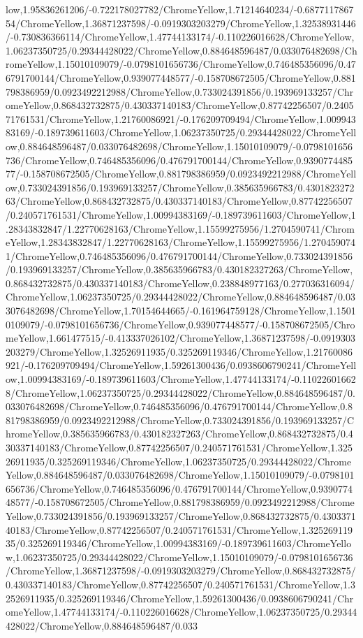 {\begin{tikzternal}
low,1.95836261206/-0.722178027782/ChromeYellow,1.71214640234/-0.687711786754/ChromeYellow,1.36871237598/-0.0919303203279/ChromeYellow,1.32538931446/-0.730836366114/ChromeYellow,1.47744133174/-0.110226016628/ChromeYellow,1.06237350725/0.29344428022/ChromeYellow,0.884648596487/0.033076482698/ChromeYellow,1.15010109079/-0.0798101656736/ChromeYellow,0.746485356096/0.476791700144/ChromeYellow,0.939077448577/-0.158708672505/ChromeYellow,0.881798386959/0.0923492212988/ChromeYellow,0.733024391856/0.193969133257/ChromeYellow,0.868432732875/0.430337140183/ChromeYellow,0.87742256507/0.240571761531/ChromeYellow,1.21760086921/-0.176209709494/ChromeYellow,1.00994383169/-0.189739611603/ChromeYellow,1.06237350725/0.29344428022/ChromeYellow,0.884648596487/0.033076482698/ChromeYellow,1.15010109079/-0.0798101656736/ChromeYellow,0.746485356096/0.476791700144/ChromeYellow,0.939077448577/-0.158708672505/ChromeYellow,0.881798386959/0.0923492212988/ChromeYellow,0.733024391856/0.193969133257/ChromeYellow,0.385635966783/0.430182327263/ChromeYellow,0.868432732875/0.430337140183/ChromeYellow,0.87742256507/0.240571761531/ChromeYellow,1.00994383169/-0.189739611603/ChromeYellow,1.28343832847/1.22770628163/ChromeYellow,1.15599275956/1.2704590741/ChromeYellow,1.28343832847/1.22770628163/ChromeYellow,1.15599275956/1.2704590741/ChromeYellow,0.746485356096/0.476791700144/ChromeYellow,0.733024391856/0.193969133257/ChromeYellow,0.385635966783/0.430182327263/ChromeYellow,0.868432732875/0.430337140183/ChromeYellow,0.238848977163/0.277036316094/ChromeYellow,1.06237350725/0.29344428022/ChromeYellow,0.884648596487/0.033076482698/ChromeYellow,1.70154644665/-0.161964759128/ChromeYellow,1.15010109079/-0.0798101656736/ChromeYellow,0.939077448577/-0.158708672505/ChromeYellow,1.661477515/-0.413337026102/ChromeYellow,1.36871237598/-0.0919303203279/ChromeYellow,1.32526911935/0.325269119346/ChromeYellow,1.21760086921/-0.176209709494/ChromeYellow,1.59261300436/0.0938606790241/ChromeYellow,1.00994383169/-0.189739611603/ChromeYellow,1.47744133174/-0.110226016628/ChromeYellow,1.06237350725/0.29344428022/ChromeYellow,0.884648596487/0.033076482698/ChromeYellow,0.746485356096/0.476791700144/ChromeYellow,0.881798386959/0.0923492212988/ChromeYellow,0.733024391856/0.193969133257/ChromeYellow,0.385635966783/0.430182327263/ChromeYellow,0.868432732875/0.430337140183/ChromeYellow,0.87742256507/0.240571761531/ChromeYellow,1.32526911935/0.325269119346/ChromeYellow,1.06237350725/0.29344428022/ChromeYellow,0.884648596487/0.033076482698/ChromeYellow,1.15010109079/-0.0798101656736/ChromeYellow,0.746485356096/0.476791700144/ChromeYellow,0.939077448577/-0.158708672505/ChromeYellow,0.881798386959/0.0923492212988/ChromeYellow,0.733024391856/0.193969133257/ChromeYellow,0.868432732875/0.430337140183/ChromeYellow,0.87742256507/0.240571761531/ChromeYellow,1.32526911935/0.325269119346/ChromeYellow,1.00994383169/-0.189739611603/ChromeYellow,1.06237350725/0.29344428022/ChromeYellow,1.15010109079/-0.0798101656736/ChromeYellow,1.36871237598/-0.0919303203279/ChromeYellow,0.868432732875/0.430337140183/ChromeYellow,0.87742256507/0.240571761531/ChromeYellow,1.32526911935/0.325269119346/ChromeYellow,1.59261300436/0.0938606790241/ChromeYellow,1.47744133174/-0.110226016628/ChromeYellow,1.06237350725/0.29344428022/ChromeYellow,0.884648596487/0.033
\end{tikzternal}}
